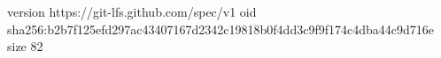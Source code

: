 version https://git-lfs.github.com/spec/v1
oid sha256:b2b7f125efd297ac43407167d2342c19818b0f4dd3c9f9f174c4dba44c9d716e
size 82
